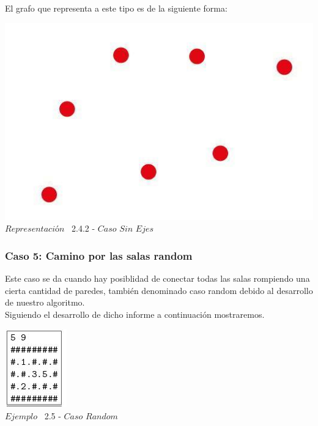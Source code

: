 El grafo que representa a este tipo es de la siguiente forma:\\

\vspace*{0.3cm} \vspace*{0.3cm}
  \begin{center}
 \includegraphics[scale=0.5]{./EJ2/grafoSinEjes.jpeg}
 \\{$Representación$ \ 2.4.2 - $Caso$ $Sin$ $Ejes$}
  \end{center}
  \vspace*{0.3cm}

\begin{center}
 \subsubsection*{Caso 5: Camino por las salas random}
\end{center}

Este caso se da cuando hay posiblidad de conectar todas las salas rompiendo una cierta cantidad de paredes, tambi\'en denominado caso random debido al desarrollo de nuestro algoritmo.\\

Siguiendo el desarrollo de dicho informe a continuaci\'on mostraremos.\\
 
\vspace*{0.3cm} \vspace*{0.3cm}
  \begin{center}
 \includegraphics[scale=1.6]{./EJ2/ej2random.jpeg}
\\ {$Ejemplo$ \ 2.5 - $Caso$ $Random$}
  \end{center}
  \vspace*{0.3cm}

